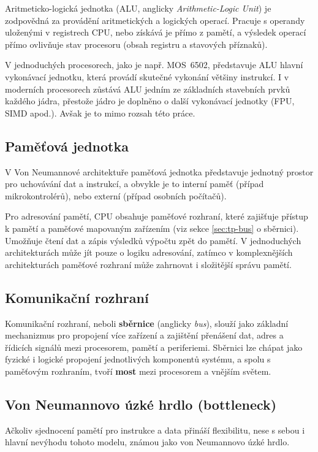 Aritmeticko-logická jednotka (ALU, anglicky \textit{Arithmetic-Logic Unit}) je zodpovědná za provádění
aritmetických a logických operací. Pracuje s operandy uloženými v registrech CPU, nebo získává je
přímo z pamětí, a výsledek operací přímo ovlivňuje stav procesoru (obsah registru a stavových
příznaků).

V jednoduchých procesorech, jako je např. MOS~6502, představuje ALU hlavní vykonávací jednotku,
která provádí skutečné vykonání většiny instrukcí. I v moderních procesorech zůstává ALU jedním ze
základních stavebních prvků každého jádra, přestože jádro je doplněno o další vykonávací jednotky
(FPU, SIMD apod.). Avšak je to mimo rozsah této práce.

\subsection{Paměťová jednotka}

V Von Neumannové architektuře paměťová jednotka představuje jednotný prostor pro uchovávání dat a
instrukcí, a obvykle je to interní paměť (případ mikrokontrolérů), nebo externí (případ osobních
počítačů).

Pro adresování pamětí, CPU obsahuje paměťové rozhraní, které zajišťuje přístup k pamětí a paměťové
mapovaným zařízením (viz sekce \ref{sec:tp-bus} o sběrnici). Umožňuje čtení dat a zápis výsledků
výpočtu zpět do pamětí. V jednoduchých architekturách může jít pouze o logiku adresování, zatímco v
komplexnějších architekturách paměťové rozhraní může zahrnovat i složitější správu pamětí.

\label{sec:tp-bus}
\subsection{Komunikační rozhraní}

Komunikační rozhraní, neboli \textbf{sběrnice} (anglicky \textit{bus}), slouží jako základní
mechanizmus pro propojení více zařízení a zajištění přenášení dat, adres a řídicích signálů mezi
procesorem, pamětí a periferiemi. Sběrnici lze chápat jako fyzické i logické propojení jednotlivých
komponentů systému, a spolu s paměťovým rozhraním, tvoří \textbf{most} mezi procesorem a vnějším
světem.

\subsection{Von Neumannovo úzké hrdlo (bottleneck)}

Ačkoliv sjednocení pamětí pro instrukce a data přináší flexibilitu, nese s sebou i hlavní nevýhodu
tohoto modelu, známou jako von Neumannovo úzké hrdlo.

